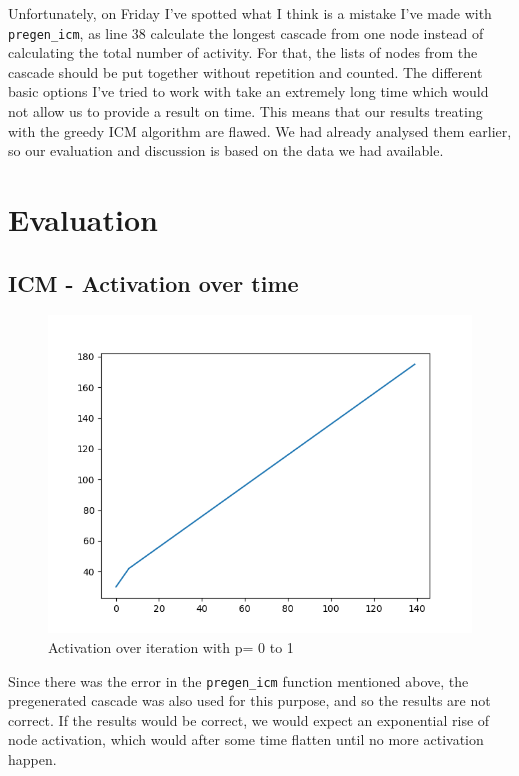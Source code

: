 Unfortunately, on Friday I've spotted what I think is a mistake I've made with \texttt{pregen\_icm}, as line 38 calculate the longest cascade from one node instead of calculating the total number of activity.
For that, the lists of nodes from the cascade should be put together without repetition and counted. The different basic options I've tried to work with take an extremely long time which would not allow us to provide a result on time. This means that our results treating with the greedy ICM algorithm are flawed. We had already analysed them earlier, so our evaluation and discussion is based on the data we had available.

\section{Evaluation}
\subsection{ICM - Activation over time}
\begin{figure}[H]
    \centering
    \includegraphics[width=0.5\linewidth]{Report/figs/ICM-0to1.png}
    \caption{Activation over iteration with p= 0 to 1}
    \label{fig:icm01}
\end{figure}
Since there was the error in the \texttt{pregen\_icm} function mentioned above, the pregenerated cascade was also used for this purpose, and so the results are not correct. If the results would be correct, we would expect an exponential rise of node activation, which would after some time flatten until no more activation happen.
